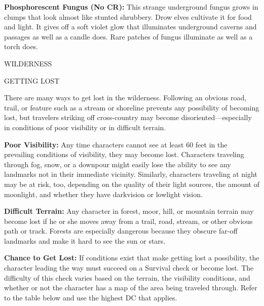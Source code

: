 \documentclass{article}
\begin{document}
\textbf{Phosphorescent Fungus (No CR): }This strange underground fungus grows in 
clumps that look almost like stunted shrubbery. Drow elves cultivate it for food 
and light. It gives off a soft violet glow that illuminates underground caverns 
and passages as well as a candle does. Rare patches of fungus illuminate as well 
as a torch does.

\vspace{12pt}
{\LARGE{}WILDERNESS}

\vspace{12pt}
GETTING LOST

There are many ways to get lost in the wilderness. Following an obvious road, trail, 
or feature such as a stream or shoreline prevents any possibility of becoming lost, 
but travelers striking off cross-country may become disoriented---especially in 
conditions of poor visibility or in difficult terrain. 

\textbf{Poor Visibility:} Any time characters cannot see at least 60 feet in the 
prevailing conditions of visibility, they may become lost. Characters traveling 
through fog, snow, or a downpour might easily lose the ability to see any landmarks 
not in their immediate vicinity. Similarly, characters traveling at night may be 
at risk, too, depending on the quality of their light sources, the amount of moonlight, 
and whether they have darkvision or lowlight vision.

\textbf{Difficult Terrain:} Any character in forest, moor, hill, or mountain terrain 
may become lost if he or she moves away from a trail, road, stream, or other obvious 
path or track. Forests are especially dangerous because they obscure far-off landmarks 
and make it hard to see the sun or stars.

\textbf{Chance to Get Lost:} If conditions exist that make getting lost a possibility, 
the character leading the way must succeed on a Survival check or become lost. 
The difficulty of this check varies based on the terrain, the visibility conditions, 
and whether or not the character has a map of the area being traveled through. 
Refer to the table below and use the highest DC that applies.
\end{document}
